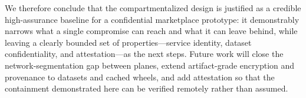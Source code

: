 We therefore conclude that the compartmentalized design is justified as a
credible high-assurance baseline for a confidential marketplace prototype: it
demonstrably narrows what a single compromise can reach and what it can leave
behind, while leaving a clearly bounded set of properties---service identity,
dataset confidentiality, and attestation---as the next steps. Future work will
close the network-segmentation gap between planes, extend artifact-grade
encryption and provenance to datasets and cached wheels, and add attestation so
that the containment demonstrated here can be verified remotely rather than
assumed.
